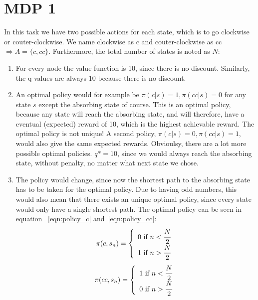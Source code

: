 \section{MDP 1}
In this task we have two possible actions for each state, which is to go clockwise or couter-clockwise.
We name clockwise as c and couter-clockwise as cc $\Rightarrow A=\{c, cc\}$. Furthermore, the total number of
states is noted as $N$:
\begin{enumerate}
    \item For every node the value function is 10, since there is no discount. Similarly, the q-values are always 10 because there is no discount.
    \item An optimal policy would for example be $\pi(c|s)=1, \pi(cc|s)=0$ for any state $s$ except the absorbing state of course. This is an optimal policy,
    because any state will reach the absorbing state, and will therefore, have a eventual (expected) reward of 10, which is the highest achievable reward. The optimal
    policy is not unique! A second policy, $\pi(c|s)=0, \pi(cc|s)=1$, would also give the same expected rewards. Obvioulsy, there are a lot more possible
    optimal policies. $q*=10$, since we would always reach the absorbing state, without penalty, no matter what next state we chose.
    \item The policy would change, since now the shortest path to the absorbing state has to be taken for the optimal policy. Due to having odd numbers,
    this would also mean that there exists an unique optimal policy, since every state would only have a single shortest path. The optimal policy can be seen in equation
    ~\ref{eqn:policy_c} and~\ref{eqn:policy_cc}:
    \begin{equation}
        \pi(c, s_n)=\left\{
            \begin{array}{ll}
                0\mbox{ if }n<\cfrac{N}{2}\\
                1\mbox{ if }n>\cfrac{N}{2}
            \end{array}
        \right.
        \label{eqn:policy_c}
    \end{equation}
    \begin{equation}
        \pi(cc, s_n)=\left\{
            \begin{array}{ll}
                1\mbox{ if }n<\cfrac{N}{2}\\
                0\mbox{ if }n>\cfrac{N}{2}
            \end{array}
        \right.
        \label{eqn:policy_cc}
    \end{equation}

\end{enumerate}
